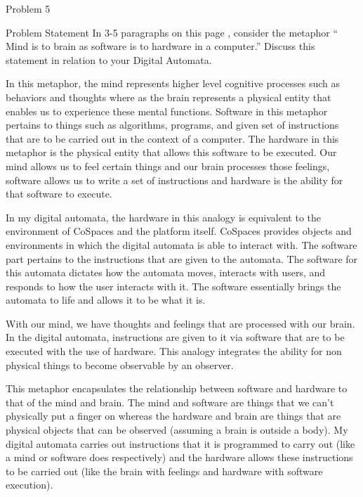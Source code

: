 \begin{problem}{Problem 5}
    \begin{statement}{Problem Statement}
        In 3-5 paragraphs on this page , consider the metaphor “ Mind is to brain as software is to hardware in a computer.” Discuss this statement in relation to your Digital Automata.
    \end{statement}

    \begin{Highlight}[Response]
        In this metaphor, the mind represents higher level cognitive processes such as behaviors and thoughts where as the brain represents a physical entity that enables us to experience these mental functions. Software in this
        metaphor pertains to things such as algorithms, programs, and given set of instructions that are to be carried out in the context of a computer. The hardware in this metaphor is the physical entity that allows this software
        to be executed. Our mind allows us to feel certain things and our brain processes those feelings, software allows us to write a set of instructions and hardware is the ability for that software to execute.

        In my digital automata, the hardware in this analogy is equivalent to the environment of CoSpaces and the platform itself. CoSpaces provides objects and environments in which the digital automata is able to interact with. The 
        software part pertains to the instructions that are given to the automata. The software for this automata dictates how the automata moves, interacts with users, and responds to how the user interacts with it. The software 
        essentially brings the automata to life and allows it to be what it is. 

        With our mind, we have thoughts and feelings that are processed with our brain. In the digital automata, instructions are given to it via software that are to be executed with the use of hardware. This analogy integrates the 
        ability for non physical things to become observable by an observer.

        This metaphor encapsulates the relationship between software and hardware to that of the mind and brain. The mind and software are things that we can't physically put a finger on whereas the hardware and brain are things that
        are physical objects that can be observed (assuming a brain is outside a body). My digital automata carries out instructions that it is programmed to carry out (like a mind or software does respectively) and the hardware allows
        these instructions to be carried out (like the brain with feelings and hardware with software execution).
    \end{Highlight}
\end{problem}

